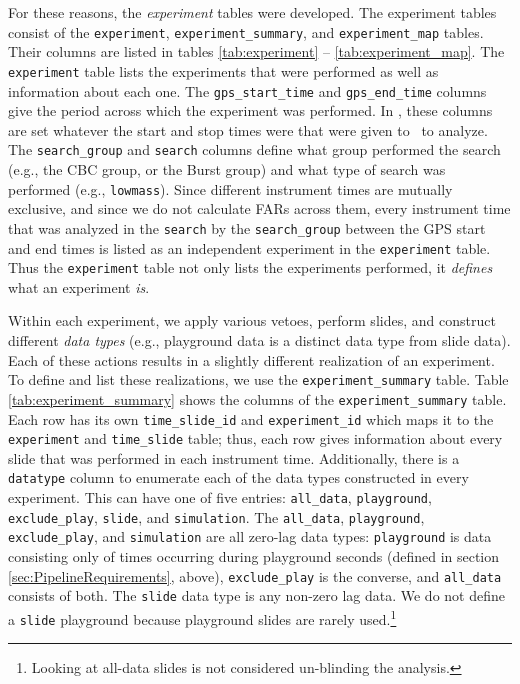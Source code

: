 For these reasons, the \emph{experiment} tables were developed. The experiment
tables consist of the \texttt{experiment}, \texttt{experiment\_summary}, and
\texttt{experiment\_map} tables. Their columns are listed in tables
\ref{tab:experiment} -- \ref{tab:experiment_map}. The \texttt{experiment} table
lists the experiments that were performed as well as information about each
one. The \texttt{gps\_start\_time} and \texttt{gps\_end\_time} columns give the
period across which the experiment was performed. In \ihope, these columns are
set whatever the start and stop times were that were given to \ihope~to
analyze. The \texttt{search\_group} and \texttt{search} columns define what
group performed the search (e.g., the \ac{CBC} group, or the Burst group) and
what type of search was performed (e.g., \texttt{lowmass}). Since different
instrument times are mutually exclusive, and since we do not calculate
\acp{FAR} across them, every instrument time that was analyzed in the
\texttt{search} by the \texttt{search\_group} between the GPS start and end
times is listed as an independent experiment in the \texttt{experiment} table.
Thus the \texttt{experiment} table not only lists the experiments performed, it
\emph{defines} what an experiment \emph{is}.

Within each experiment, we apply various vetoes, perform slides, and construct
different \emph{data types} (e.g., playground data is a distinct data type from
slide data). Each of these actions results in a slightly different realization
of an experiment. To define and list these realizations, we use the
\texttt{experiment\_summary} table. Table \ref{tab:experiment_summary} shows
the columns of the \texttt{experiment\_summary} table. Each row has its own
\texttt{time\_slide\_id} and \texttt{experiment\_id} which maps it to the
\texttt{experiment} and \texttt{time\_slide} table; thus, each row gives
information about every slide that was performed in each instrument time.
Additionally, there is a \texttt{datatype} column to enumerate each of the data
types constructed in every experiment. This can have one of five entries:
\texttt{all\_data}, \texttt{playground}, \texttt{exclude\_play},
\texttt{slide}, and \texttt{simulation}. The \texttt{all\_data},
\texttt{playground}, \texttt{exclude\_play}, and \texttt{simulation} are all
zero-lag data types: \texttt{playground} is data consisting only of times
occurring during playground seconds (defined in section
\ref{sec:PipelineRequirements}, above), \texttt{exclude\_play} is the converse,
and \texttt{all\_data} consists of both. The \texttt{slide} data type is any
non-zero lag data. We do not define a \texttt{slide} playground because
playground slides are rarely used.\footnote{Looking at all-data slides is not
considered un-blinding the analysis.}

